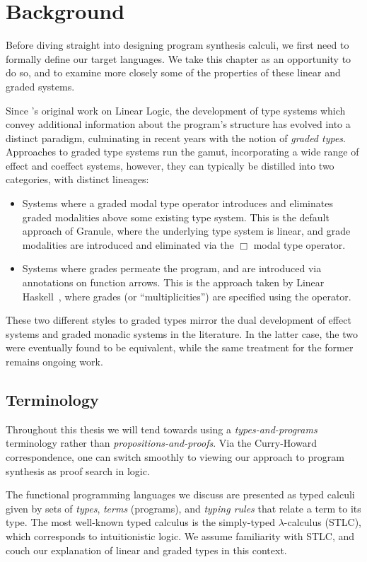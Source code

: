 \chapter{Background}
\label{chapter:background}
Before diving straight into designing program synthesis calculi, we first need
to formally define our target languages. We take
this chapter as an opportunity to do so, and to examine more closely some
of the properties of these linear and graded systems. 

Since \citet{girard1987linear}'s original work on Linear Logic,
the development of type systems which convey additional information about the
program's structure has evolved into a distinct paradigm, culminating in recent
years with the notion of \textit{graded types}. Approaches to graded type
systems run the gamut, incorporating a wide range of effect and coeffect
systems, however, they can typically be distilled into two categories, with
distinct lineages: 
\begin{itemize}
  \item Systems where a graded modal type operator introduces and eliminates
        graded modalities above some existing type system. This is the default
        approach of Granule, where the underlying type system is linear, and
        grade modalities are introduced and eliminated via the $\Box$ modal type
        operator.
  \item Systems where grades permeate the program, and are introduced via
        annotations on function arrows. This is the approach taken by Linear
        Haskell~\citep{DBLP:journals/pacmpl/BernardyBNJS18}, where grades (or
        ``multiplicities'') are specified using the \granin{\%} operator. 
\end{itemize}  
These two different styles to graded types mirror the dual development of effect
systems and graded monadic systems in the literature. In the latter case, the
two were eventually found to be equivalent, while the same treatment for the
former remains ongoing work. 

\section{Terminology}
Throughout this thesis we will tend towards using a \textit{types-and-programs}
terminology rather than \textit{propositions-and-proofs}. Via the Curry-Howard
correspondence, one can switch smoothly to viewing our approach to program
synthesis as proof search in logic.

The functional programming languages we discuss are presented as typed
calculi given by sets of \textit{types}, \textit{terms} (programs), and \textit{typing
 rules} that relate a term to its type. The most well-known typed
calculus is the simply-typed $\lambda$-calculus (STLC), which corresponds to
intuitionistic logic. We assume familiarity with STLC, and 
couch our explanation of linear and graded types in this context.

